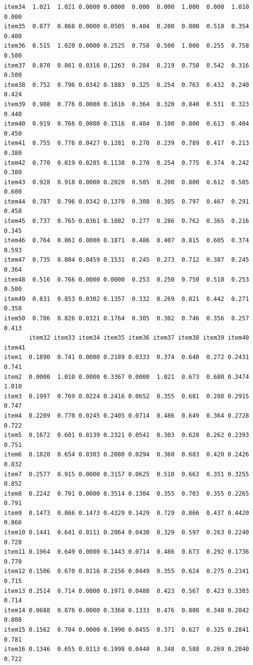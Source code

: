 \documentclass[
  a4paper,
]{ltjsbook}
\begin{document}
\begin{verbatim}
item34  1.021  1.021 0.0000 0.0000  0.000  0.000  1.000  0.000  1.010  0.000
item35  0.877  0.868 0.0000 0.0505  0.404  0.200  0.800  0.510  0.354  0.400
item36  0.515  1.020 0.0000 0.2525  0.758  0.500  1.000  0.255  0.758  0.500
item37  0.870  0.861 0.0316 0.1263  0.284  0.219  0.750  0.542  0.316  0.500
item38  0.752  0.796 0.0342 0.1883  0.325  0.254  0.763  0.432  0.240  0.424
item39  0.908  0.776 0.0000 0.1616  0.364  0.320  0.840  0.531  0.323  0.440
item40  0.919  0.766 0.0000 0.1516  0.404  0.100  0.800  0.613  0.404  0.450
item41  0.755  0.776 0.0427 0.1281  0.270  0.239  0.789  0.417  0.213  0.380
item42  0.770  0.819 0.0285 0.1138  0.270  0.254  0.775  0.374  0.242  0.380
item43  0.928  0.918 0.0000 0.2020  0.505  0.200  0.800  0.612  0.505  0.600
item44  0.787  0.796 0.0342 0.1370  0.308  0.305  0.797  0.467  0.291  0.458
item45  0.737  0.765 0.0361 0.1082  0.277  0.286  0.762  0.365  0.216  0.345
item46  0.764  0.861 0.0000 0.1871  0.486  0.407  0.815  0.605  0.374  0.593
item47  0.735  0.804 0.0459 0.1531  0.245  0.273  0.712  0.387  0.245  0.364
item48  0.516  0.766 0.0000 0.0000  0.253  0.250  0.750  0.510  0.253  0.500
item49  0.831  0.853 0.0302 0.1357  0.332  0.269  0.821  0.442  0.271  0.358
item50  0.786  0.826 0.0321 0.1764  0.305  0.302  0.746  0.356  0.257  0.413
       item32 item33 item34 item35 item36 item37 item38 item39 item40 item41
item1  0.1890  0.741 0.0000 0.2189 0.0333  0.374  0.640  0.272 0.2431  0.741
item2  0.0000  1.010 0.0000 0.3367 0.0000  1.021  0.673  0.680 0.3474  1.010
item3  0.1997  0.769 0.0224 0.2416 0.0652  0.355  0.681  0.288 0.2915  0.747
item4  0.2209  0.770 0.0245 0.2405 0.0714  0.486  0.649  0.364 0.2728  0.722
item5  0.1672  0.601 0.0139 0.2321 0.0541  0.303  0.628  0.262 0.2393  0.751
item6  0.1820  0.654 0.0303 0.2080 0.0294  0.360  0.683  0.420 0.2426  0.832
item7  0.2577  0.915 0.0000 0.3157 0.0625  0.510  0.663  0.351 0.3255  0.852
item8  0.2242  0.791 0.0000 0.3514 0.1304  0.355  0.703  0.355 0.2265  0.791
item9  0.1473  0.866 0.1473 0.4329 0.1429  0.729  0.866  0.437 0.4420  0.866
item10 0.1441  0.641 0.0111 0.2064 0.0430  0.329  0.597  0.263 0.2240  0.728
item11 0.1964  0.649 0.0000 0.1443 0.0714  0.486  0.673  0.292 0.1736  0.770
item12 0.1506  0.670 0.0116 0.2156 0.0449  0.355  0.624  0.275 0.2341  0.715
item13 0.2514  0.714 0.0000 0.1971 0.0488  0.423  0.567  0.423 0.3303  0.714
item14 0.0688  0.876 0.0000 0.3368 0.1333  0.476  0.808  0.340 0.2042  0.808
item15 0.1562  0.704 0.0000 0.1990 0.0455  0.371  0.627  0.325 0.2841  0.781
item16 0.1346  0.655 0.0113 0.1998 0.0440  0.348  0.588  0.269 0.2040  0.722

\end{verbatim}
\end{document}
